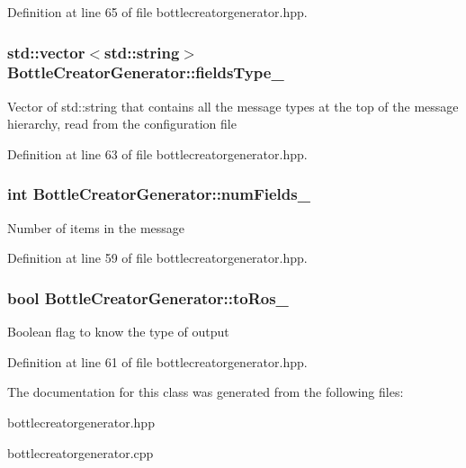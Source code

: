 Definition at line 65 of file bottlecreatorgenerator.\-hpp.

\hypertarget{classBottleCreatorGenerator_abad8d5103182e56c2c9b96cab85c0602}{
\subsubsection[{fields\-Type\-\_\-}]{\setlength{\rightskip}{0pt plus 5cm}std\-::vector$<$std\-::string$>$ Bottle\-Creator\-Generator\-::fields\-Type\-\_\-\hspace{0.3cm}{\ttfamily [private]}}}\label{classBottleCreatorGenerator_abad8d5103182e56c2c9b96cab85c0602}
Vector of std\-::string that contains all the message types at the top of the message hierarchy, read from the configuration file 

Definition at line 63 of file bottlecreatorgenerator.\-hpp.

\hypertarget{classBottleCreatorGenerator_ab2b5f38e2b44b14d26ca3eebcb42648a}{
\subsubsection[{num\-Fields\-\_\-}]{\setlength{\rightskip}{0pt plus 5cm}int Bottle\-Creator\-Generator\-::num\-Fields\-\_\-\hspace{0.3cm}{\ttfamily [private]}}}\label{classBottleCreatorGenerator_ab2b5f38e2b44b14d26ca3eebcb42648a}
Number of items in the message 

Definition at line 59 of file bottlecreatorgenerator.\-hpp.

\hypertarget{classBottleCreatorGenerator_aa20440ff74cb4ee807221653872611dd}{
\subsubsection[{to\-Ros\-\_\-}]{\setlength{\rightskip}{0pt plus 5cm}bool Bottle\-Creator\-Generator\-::to\-Ros\-\_\-\hspace{0.3cm}{\ttfamily [private]}}}\label{classBottleCreatorGenerator_aa20440ff74cb4ee807221653872611dd}
Boolean flag to know the type of output 

Definition at line 61 of file bottlecreatorgenerator.\-hpp.



The documentation for this class was generated from the following files\-:\begin{DoxyCompactItemize}
\item 
bottlecreatorgenerator.\-hpp\item 
bottlecreatorgenerator.\-cpp\end{DoxyCompactItemize}
